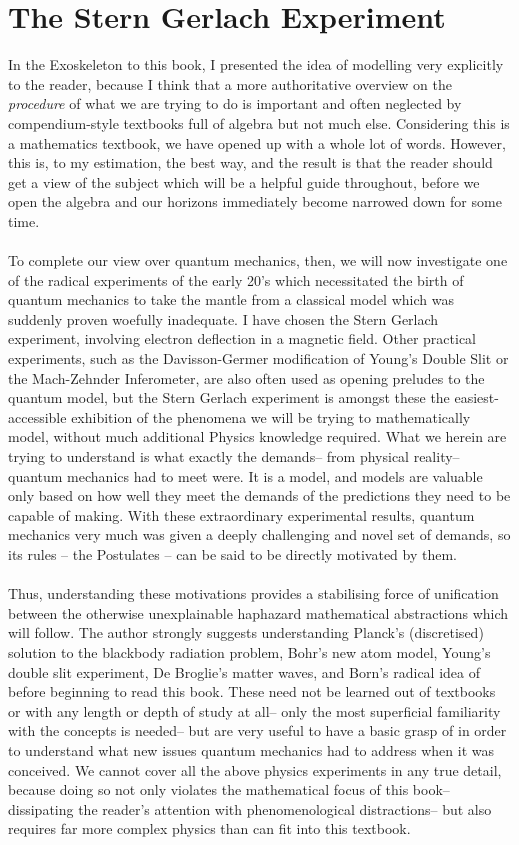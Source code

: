 \chapter{The Stern Gerlach Experiment}
In the Exoskeleton to this book, I presented the idea of modelling very explicitly to the reader, because I think that a more authoritative overview on the \emph{procedure} of what we are trying to do is important and often neglected by compendium-style textbooks full of algebra but not much else. Considering this is a mathematics textbook, we have opened up with a whole lot of words. However, this is, to my estimation, the best way, and the result is that the reader should get a  view of the subject which will be a helpful guide throughout, before we open the algebra and our horizons immediately become narrowed down for some time.
\\\\
To complete our  view over quantum mechanics, then, we will now investigate one of the radical experiments of the early 20's which necessitated the birth of quantum mechanics to take the mantle from a classical model which was suddenly proven woefully inadequate. I have chosen the Stern Gerlach experiment, involving electron deflection in a magnetic field. Other practical experiments, such as the Davisson-Germer modification of Young's Double Slit or the Mach-Zehnder Inferometer, are also often used as opening preludes to the quantum model, but the Stern Gerlach experiment is amongst these the easiest-accessible exhibition of the phenomena we will be trying to mathematically model, without much additional Physics knowledge required. What we herein are trying to understand is what exactly the demands-- from physical reality-- quantum mechanics had to meet were. It is a model, and models are valuable only based on how well they meet the demands of the predictions they need to be capable of making. With these extraordinary experimental results, quantum mechanics very much was given a deeply challenging and novel set of demands, so its rules -- the Postulates -- can be said to be directly motivated by them.
\\\\
Thus, understanding these motivations provides a stabilising force of unification between the otherwise unexplainable haphazard mathematical abstractions which will follow. The author strongly suggests understanding Planck's (discretised) solution to the blackbody radiation problem, Bohr's new atom model, Young's double slit experiment, De Broglie's matter waves, and Born's radical idea of  before beginning to read this book. These need not be learned out of textbooks or with any length or depth of study at all-- only the most superficial familiarity with the concepts is needed-- but are very useful to have a basic grasp of in order to understand what new issues quantum mechanics had to address when it was conceived. We cannot cover all the above physics experiments in any true detail, because doing so not only violates the mathematical focus of this book-- dissipating the reader's attention with phenomenological distractions-- but also requires far more complex physics than can fit into this textbook. 
